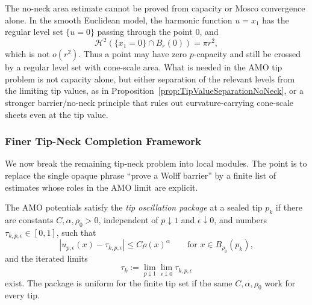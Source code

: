 \begin{remark}
\label{rem:NoNeckNecessity}
The no-neck area estimate cannot be proved from capacity or Mosco convergence
alone.  In the smooth Euclidean model, the harmonic function \(u=x_1\) has the
regular level set \(\{u=0\}\) passing through the point \(0\), and
\[
    \mathcal H^2(\{x_1=0\}\cap B_r(0))=\pi r^2,
\]
which is not \(o(r^2)\).  Thus a point may have zero \(p\)-capacity and still
be crossed by a regular level set with cone-scale area.  What is needed in the
AMO tip problem is not capacity alone, but either separation of the relevant
levels from the limiting tip values, as in
Proposition~\ref{prop:TipValueSeparationNoNeck}, or a stronger barrier/no-neck
principle that rules out curvature-carrying cone-scale sheets even at the tip
value.
\end{remark}

\subsubsection{Finer Tip-Neck Completion Framework}
\label{subsubsec:FinerTipNeckFramework}

We now break the remaining tip-neck problem into local modules.  The point is
to replace the single opaque phrase ``prove a Wolff barrier'' by a finite list
of estimates whose roles in the AMO limit are explicit.

\begin{definition}\label{def:TipOscillationPackage}
The AMO potentials satisfy the \emph{tip oscillation package} at a sealed tip
\(p_k\) if there are constants \(C,\alpha,\rho_0>0\), independent of
\(p\downarrow1\) and \(\epsilon\downarrow0\), and numbers
\(\tau_{k,p,\epsilon}\in[0,1]\), such that
\[
    |u_{p,\epsilon}(x)-\tau_{k,p,\epsilon}|
    \le C\rho(x)^\alpha
    \qquad
    \text{for }x\in B_{\rho_0}(p_k),
\]
and the iterated limits
\[
    \tau_k:=\lim_{p\downarrow1}\lim_{\epsilon\downarrow0}
    \tau_{k,p,\epsilon}
\]
exist.  The package is uniform for the finite tip set if the same
\(C,\alpha,\rho_0\) work for every tip.
\end{definition}

